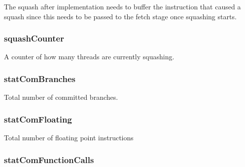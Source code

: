 The squash after implementation needs to buffer the instruction that caused a squash since this needs to be passed to the fetch stage once squashing starts. \hypertarget{classDefaultCommit_a06341c2bebd8c862e411e474e01c9c1a}{
\subsubsection[{squashCounter}]{ {\bf squashCounter}}}
\label{classDefaultCommit_a06341c2bebd8c862e411e474e01c9c1a}
A counter of how many threads are currently squashing. \hypertarget{classDefaultCommit_a39a7da0b20d1e83ccfe4b2f2b19d6e94}{
\subsubsection[{statComBranches}]{ {\bf statComBranches}}}
\label{classDefaultCommit_a39a7da0b20d1e83ccfe4b2f2b19d6e94}
Total number of committed branches. \hypertarget{classDefaultCommit_a2be26eb7dfa8b9e36d0c6fdcaea8d818}{
\subsubsection[{statComFloating}]{ {\bf statComFloating}}}
\label{classDefaultCommit_a2be26eb7dfa8b9e36d0c6fdcaea8d818}
Total number of floating point instructions \hypertarget{classDefaultCommit_acd1aba8c2f19771552212e9c2917ac6b}{
\subsubsection[{statComFunctionCalls}]{ {\bf statComFunctionCalls}}}
